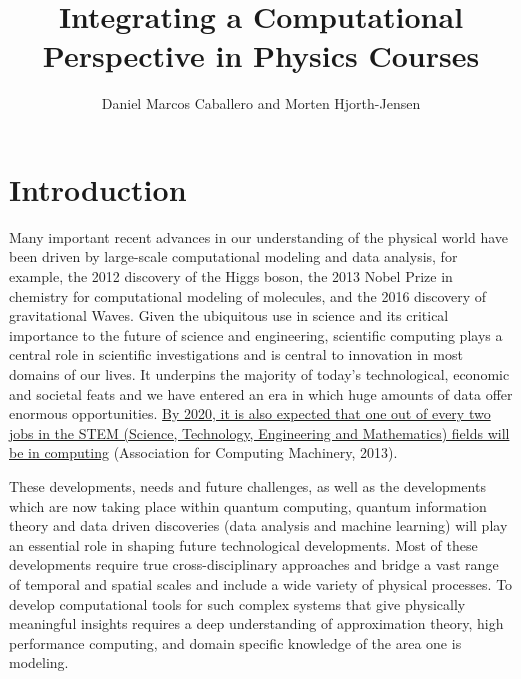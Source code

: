 \documentclass[graybox,envcountchap,sectrefs]{svmult}
\begin{document}

\title{Integrating a Computational Perspective in Physics Courses}
\author{Daniel Marcos Caballero and Morten Hjorth-Jensen}


\maketitle


\section{Introduction}

Many important recent advances in our understanding of the physical
world have been driven by large-scale computational modeling and data
analysis, for example, the 2012 discovery of the Higgs boson, the 2013
Nobel Prize in chemistry for computational modeling of molecules, and
the 2016 discovery of gravitational Waves.  Given the ubiquitous use
in science and its critical importance to the future of science and
engineering, scientific computing plays a central role in scientific
investigations and is central to innovation in most domains of our
lives. It underpins the majority of today's technological, economic
and societal feats and we have entered an era in which huge amounts of
data offer enormous opportunities. \href{{http://pathways.acm.org/executive-summary.html}}{By 2020, it is also expected that one out of every two
jobs in the STEM (Science, Technology, Engineering and Mathematics) fields will be in
computing}
(Association for Computing Machinery, 2013).

These developments, needs and future challenges, as well as the
developments which are now taking place within quantum computing,
quantum information theory and data driven discoveries (data analysis and
machine learning) will play an essential role in shaping future
technological developments. Most of these developments require true
cross-disciplinary approaches and bridge a vast range of
temporal and spatial scales and include a wide variety of physical
processes. To develop computational tools for such complex
systems that give physically meaningful insights requires a deep
understanding of approximation theory, high performance computing, and
domain specific knowledge of the area one is modeling.
\end{document}
